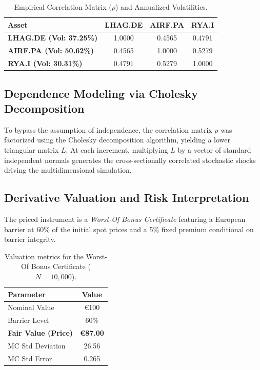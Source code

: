 \documentclass{report}
\begin{document}
\begin{table}[htbp]
    \centering
    \begin{tabular}{lccc}
        \toprule
        \textbf{Asset} & \textbf{LHAG.DE} & \textbf{AIRF.PA} & \textbf{RYA.I} \\
        \midrule
        \textbf{LHAG.DE (Vol: 37.25\%)} & 1.0000 & 0.4565 & 0.4791 \\
        \textbf{AIRF.PA (Vol: 50.62\%)} & 0.4565 & 1.0000 & 0.5279 \\
        \textbf{RYA.I (Vol: 30.31\%)}   & 0.4791 & 0.5279 & 1.0000 \\
        \bottomrule
    \end{tabular}
    \caption{Empirical Correlation Matrix ($\rho$) and Annualized Volatilities.}
    \label{tab:correlation}
\end{table}

\subsection{Dependence Modeling via Cholesky Decomposition}
To bypass the assumption of independence, the correlation matrix $\rho$ was factorized using the Cholesky decomposition algorithm, yielding a lower triangular matrix $L$. At each increment, multiplying $L$ by a vector of standard independent normals generates the cross-sectionally correlated stochastic shocks driving the multidimensional simulation.

\subsection{Derivative Valuation and Risk Interpretation}
The priced instrument is a \textit{Worst-Of Bonus Certificate} featuring a European barrier at 60\% of the initial spot prices and a 5\% fixed premium conditional on barrier integrity. 

\begin{table}[htbp]
    \centering
    \begin{tabular}{lc}
        \toprule
        \textbf{Parameter} & \textbf{Value} \\
        \midrule
        Nominal Value & \euro{100} \\
        Barrier Level & 60\% \\
        \midrule
        \textbf{Fair Value (Price)} & \textbf{\euro{87.00}} \\
        MC Std Deviation & 26.56 \\
        MC Std Error & 0.265 \\
        \bottomrule
    \end{tabular}
    \caption{Valuation metrics for the Worst-Of Bonus Certificate ($N=10{,}000$).}
    \label{tab:worstof}
\end{table}
\end{document}
